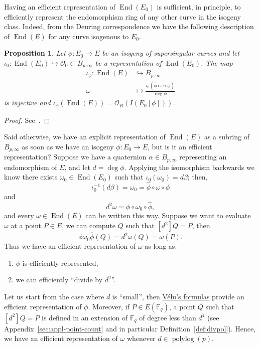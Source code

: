\documentclass[10pt]{article}
\theoremstyle{plain}
\newtheorem{proposition}[theorem]{Proposition}
\theoremstyle{definition}
\DeclareMathOperator{\End}{End} %
\DeclareMathOperator{\polylog}{polylog}
\def\F{\ensuremath{\mathbb{F}}}
\def\O{\ensuremath{\mathcal{O}}}
\begin{document}
Having an efficient representation of $\End(E_0)$ is sufficient, in
principle, to efficiently represent the endomorphism ring of any other
curve in the isogeny class. %
Indeed, from the Deuring correspondence we have the following
description of $\End(E)$ for any curve isogenous to $E_0$.

\begin{proposition}
  Let $ϕ : E_0 → E$ be an isogeny of supersingular curves and let
  $ι_0 : \End(E_0) \hookrightarrow \O_0 ⊂ B_{p,∞}$ be a representation of $\End(E_0)$. %
  The map
  \begin{align*}
    ι_ϕ : \End(E) &\hookrightarrow B_{p,∞}\\
    ω &\mapsto \frac{ι_0(\hat{ϕ}∘ω∘ϕ)}{\deg ϕ}
  \end{align*}
  is injective and $ι_ϕ(\End(E)) = \O_R(I(E_0[ϕ]))$.
\end{proposition}
\begin{proof}
  See~\cite[Lemma~42.2.10]{Voight2018}.
\end{proof}

Said otherwise, we have an explicit representation of $\End(E)$ as a
subring of $B_{p,∞}$ as soon as we have an isogeny $ϕ:E_0→E$, but is
it an efficient representation? %
Suppose we have a quaternion $α ∈ B_{p,∞}$ representing an
endomorphism of $E$, and let $d = \deg ϕ$. %
Applying the isomorphism backwards we know there exists
$ω_0 ∈ \End(E_0)$ such that $ι_0(ω_0) = dβ$; then, 
\[ι_0^{-1}(dβ) = ω_0 = \hat{ϕ} ∘ ω ∘ ϕ\]
and
\[d^2 ω = ϕ ∘ ω_0 ∘ \hat{ϕ},\] %
and every $ω ∈ \End(E)$ can be written this way. %
Suppose we want to evaluate $ω$ at a point $P ∈ E$, we can compute $Q$
such that $[d^2]Q = P$, then
\[ϕω_0\hat{ϕ}(Q) = d^2ω(Q) = ω(P).\]
Thus we have an efficient representation of $ω$ as long as:
\begin{enumerate}
\item $ϕ$ is efficiently represented,
\item we can efficiently ``divide by $d^2$''.
\end{enumerate}

Let us start from the case where $d$ is ``small'', then
\hyperref[th:velu]{Vélu's formulas} provide an efficient
representation of $ϕ$. %
Moreover, if $P ∈ E(\F_q)$, a point $Q$ such that $[d^2]Q = P$ is
defined in an extension of $\F_q$ of degree less than $d^4$ (see
Appendix~\ref{sec:appl-point-count} and in particular
Definition~\ref{def:divpol}). %
Hence, we have an efficient representation of $ω$ whenever
$d ∈ \polylog(p)$.
\end{document}
